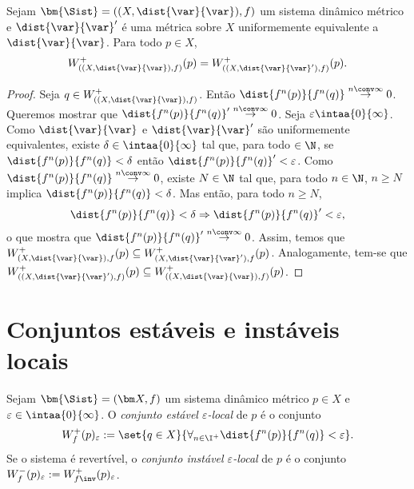 \begin{proposition}
Sejam $\bm{\Sist}=((X,\dist{\var}{\var}),f)$ um sistema dinâmico métrico e $\dist{\var}{\var}'$ é uma métrica sobre $X$ uniformemente equivalente a $\dist{\var}{\var}$. Para todo $p \in X$,
	\begin{equation*}
	W^+_{((X,\dist{\var}{\var}),f)}(p) = W^+_{((X,\dist{\var}{\var}'),f)}(p).
	\end{equation*}
\end{proposition}
\begin{proof}
Seja $q \in W^+_{((X,\dist{\var}{\var}),f)}$. Então $\dist{f^n(p)}{f^n(q)} \overset{n \conv \infty}{\to} 0$. Queremos mostrar que $\dist{f^n(p)}{f^n(q)}' \overset{n \conv \infty}{\to} 0$. Seja $\varepsilon \intaa{0}{\infty}$. Como $\dist{\var}{\var}$ e $\dist{\var}{\var}'$ são uniformemente equivalentes, existe $\delta \in \intaa{0}{\infty}$ tal que, para todo $ \in \N$, se $\dist{f^n(p)}{f^n(q)} < \delta$ então $\dist{f^n(p)}{f^n(q)}' < \varepsilon$. Como $\dist{f^n(p)}{f^n(q)} \overset{n \conv \infty}{\to} 0$, existe $N \in \N$ tal que, para todo $n \in \N$, $n \geq N$ implica $\dist{f^n(p)}{f^n(q)} < \delta$. Mas então, para todo $n \geq N$,
	\begin{equation*}
	\dist{f^n(p)}{f^n(q)} < \delta \Rightarrow \dist{f^n(p)}{f^n(q)}' < \varepsilon,
	\end{equation*}
o que mostra que $\dist{f^n(p)}{f^n(q)}' \overset{n \conv \infty}{\to} 0$. Assim, temos que $W^+_{(X,\dist{\var}{\var}),f}(p) \subseteq W^+_{(X,\dist{\var}{\var}'),f}(p)$. Analogamente, tem-se que $W^+_{((X,\dist{\var}{\var}'),f)}(p) \subseteq W^+_{((X,\dist{\var}{\var}),f)}(p)$.
\end{proof}


\section{Conjuntos estáveis e instáveis locais}

\begin{definition}
Sejam $\bm{\Sist}=(\bm X,f)$ um sistema dinâmico métrico $p \in X$ e $\varepsilon \in \intaa{0}{\infty}$. O \emph{conjunto estável $\varepsilon$-local} de $p$ é o conjunto
	\begin{equation*}
	W^+_f(p)_\varepsilon := \set{q \in X}{\forall_{n \in \I^+} \dist{f^n(p)}{f^n(q)} < \varepsilon}.
	\end{equation*}
Se o sistema é revertível, o \emph{conjunto instável $\varepsilon$-local} de $p$ é o conjunto $W^-_f(p)_\varepsilon := W^+_{f\inv}(p)_\varepsilon$.
\end{definition}

